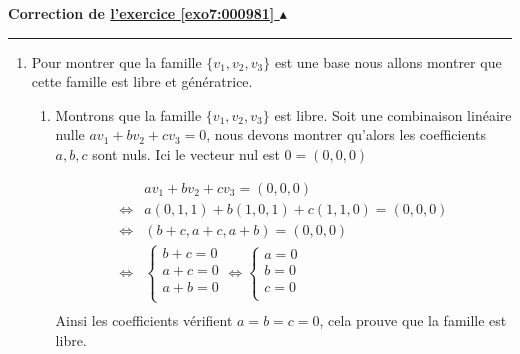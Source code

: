 \documentclass[11pt,a4paper]{article}
\newcounter{exo}
\newcommand{\correction}[1]{\hypertarget{cor7:#1}{}\label{cor7:#1}{\bf Correction de \hyperlink{exo7:#1}{l'exercice \ref{exo7:#1} $\blacktriangle$}}\vspace{1mm}\hrule\vspace{1mm}}
\begin{document}
\correction{000981}
\begin{enumerate}
  \item Pour montrer que la famille $\{ v_1, v_2, v_3\}$ est une base nous allons 
montrer que cette famille est libre et génératrice.


  \begin{enumerate}
    \item Montrons que la famille $\{ v_1, v_2, v_3\}$ est libre.
Soit une combinaison linéaire nulle $a v_1+b v_2 + c v_3 = 0$, nous devons montrer qu'alors
les coefficients $a,b,c$ sont nuls. Ici le vecteur nul est $0=(0,0,0)$

\begin{align*}
  &  a v_1+b v_2 + c v_3 = (0,0,0) \\
\iff & a (0,1,1) + b(1,0,1) + c(1,1,0) = (0,0,0) \\
\iff & (b+c,a+c,a+b)=(0,0,0) \\
\iff & \begin{cases}
       b+c = 0 \\
       a+c = 0 \\
       a+b = 0  \\
       \end{cases} 
\iff \begin{cases}
       a = 0 \\
       b = 0 \\
       c = 0  \\
       \end{cases} \\
\end{align*}
Ainsi les coefficients vérifient $a=b=c=0$, cela prouve que la famille est libre.


\end{enumerate}
\end{enumerate}
\end{document}
